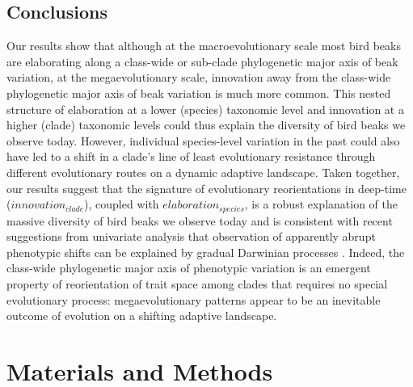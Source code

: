 \documentclass[12pt,letterpaper]{article}
\begin{document}
\subsection{Conclusions}
Our results show that although at the macroevolutionary scale most bird beaks are elaborating along a class-wide or sub-clade phylogenetic major axis of beak variation, at the megaevolutionary scale, innovation away from the class-wide phylogenetic major axis of beak variation is much more common.
This nested structure of elaboration at a lower (species) taxonomic level and innovation at a higher (clade) taxonomic levels could thus explain the diversity of bird beaks we observe today.
However, individual species-level variation in the past could also have led to a shift in a clade's line of least evolutionary resistance through different evolutionary routes on a dynamic adaptive landscape.
Taken together, our results suggest that the signature of evolutionary reorientations in deep-time ($innovation_{clade}$), coupled with $elaboration_{species}$, is a robust explanation of the massive diversity of bird beaks we observe today and is consistent with recent suggestions from univariate analysis that observation of apparently abrupt phenotypic shifts can be explained by gradual Darwinian processes \cite{pagel2022general, BurinWhales,goswami2022}.
Indeed, the class-wide phylogenetic major axis of phenotypic variation is an emergent property of reorientation of trait space among clades that requires no special evolutionary process: megaevolutionary patterns appear to be an inevitable outcome of evolution on a shifting adaptive landscape.
 
\section{Materials and Methods}
\end{document}
